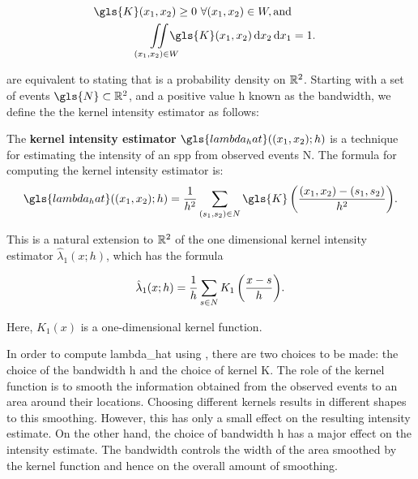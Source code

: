 \begin{align}
    \gls{K}\xvec \ge 0~ \forall \xvec \in W, \text{and} \label{eq:k_pos} \\
    \iintW{\gls{K}\xvec} & = 1 \label{eq:k_1} \text{.}
\end{align}

 are equivalent to stating that \Kdots is a probability density on $\mathbb{R}^2$.
Starting with a set of \glspl{event} $\gls{N} \subset \RS$,
and a positive value \gls{h} known as the bandwidth,
we define the the \gls{kernel intensity estimator} as follows:

\begin{defn}
    \label{defn:lambda_hat}
    The \textbf{\gls{kernel intensity estimator}} $\gls{lambda_hat}(\xvec;h)$
    is a technique for estimating the \gls{intensity} of an \gls{spp}
    from observed \glspl{event} \gls{N}.
    The formula for computing the \gls{kernel intensity estimator} is:
    \begin{equation}
        \label{eq:lambda_hat}
        \gls{lambda_hat}(\xvec; h) 
            = \sumS{\gls{K}\left(\frac{\xvec-(s_1, s_2)}{h^2}\right)} \text{.}%
    \end{equation}
\end{defn}

This is a natural extension to $\mathbb{R}^2$ of the one dimensional \gls{kernel intensity estimator} $\hat{\lambda}_1(x;h)$,
which has the formula

\begin{equation}
    \label{eq:lambda_hat_1}
    \hat{\lambda}_1(x;h) = \sumSone{K_1\left(\frac{x - s}{h}\right)} \text{.}%
\end{equation}

Here, $K_1(x)$ is a one-dimensional kernel function.

In order to compute \gls{lambda_hat} using ,
there are two choices to be made: the choice of the bandwidth \gls{h}
and the choice of \gls{kernel} \gls{K}.
The role of the \gls{kernel} function \Kdots is to smooth the information obtained
from the observed \glspl{event} to an area around their locations.
Choosing different \glspl{kernel} results in different shapes to this smoothing.
However, this has only a small effect on the resulting \gls{intensity} estimate.
On the other hand,
the choice of bandwidth \gls{h} has a major effect on the \gls{intensity} estimate.
The bandwidth controls the width of the area smoothed by the \gls{kernel} function and hence on the overall amount of smoothing.

